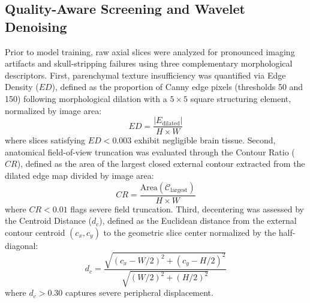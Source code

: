 \documentclass[preprint,12pt,authoryear]{elsarticle}
\begin{document}
\subsection{Quality-Aware Screening and Wavelet Denoising}
Prior to model training, raw axial slices were analyzed for pronounced imaging artifacts and skull-stripping failures using three complementary morphological descriptors. First, parenchymal texture insufficiency was quantified via Edge Density ($ED$), defined as the proportion of Canny edge pixels (thresholds 50 and 150) following morphological dilation with a $5 \times 5$ square structuring element, normalized by image area:
\begin{equation}
ED = \frac{|E_{\text{dilated}}|}{H \times W}
\end{equation}
where slices satisfying $ED < 0.003$ exhibit negligible brain tissue. Second, anatomical field-of-view truncation was evaluated through the Contour Ratio ($CR$), defined as the area of the largest closed external contour extracted from the dilated edge map divided by image area:
\begin{equation}
CR = \frac{\text{Area}(\mathcal{C}_{\text{largest}})}{H \times W}
\end{equation}
where $CR < 0.01$ flags severe field truncation. Third, decentering was assessed by the Centroid Distance ($d_c$), defined as the Euclidean distance from the external contour centroid $(c_x, c_y)$ to the geometric slice center normalized by the half-diagonal:
\begin{equation}
d_c = \frac{\sqrt{(c_x - W/2)^2 + (c_y - H/2)^2}}{\sqrt{(W/2)^2 + (H/2)^2}}
\end{equation}
where $d_c > 0.30$ captures severe peripheral displacement.
\end{document}
